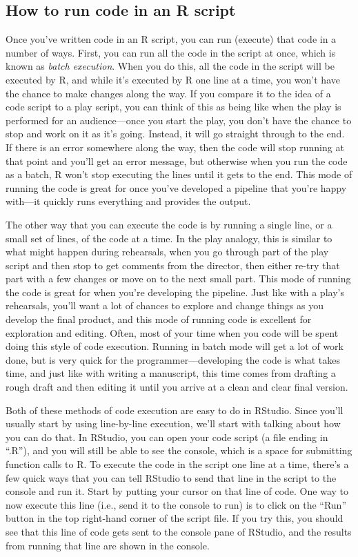 \documentclass[]{tufte-book}
\begin{document}
\subsection{How to run code in an R script}\label{how-to-run-code-in-an-r-script}

Once you've written code in an R script, you can run (execute) that code in a
number of ways. First, you can run all the code in the script at once, which is
known as \emph{batch execution}. When you do this, all the code in the script will be
executed by R, and while it's executed by R one line at a time, you won't have
the chance to make changes along the way. If you compare it to the idea of a
code script to a play script, you can think of this as being like when the
play is performed for an audience---once you start the play, you don't have
the chance to stop and work on it as it's going. Instead, it will go straight
through to the end. If there is an error somewhere along the way, then the code
will stop running at that point and you'll get an error message, but otherwise
when you run the code as a batch, R won't stop executing the lines until it gets
to the end. This mode of running the code is great for once you've developed a
pipeline that you're happy with---it quickly runs everything and provides the
output.

The other way that you can execute the code is by running a single line, or a
small set of lines, of the code at a time. In the play analogy, this is similar
to what might happen during rehearsals, when you go through part of the play
script and then stop to get comments from the director, then either re-try that
part with a few changes or move on to the next small part. This mode of running
the code is great for when you're developing the pipeline. Just like with a
play's rehearsals, you'll want a lot of chances to explore and change things as
you develop the final product, and this mode of running code is excellent for
exploration and editing. Often, most of your time when you code will be spent
doing this style of code execution. Running in batch mode will get a lot of work
done, but is very quick for the programmer---developing the code is what takes
time, and just like with writing a manuscript, this time comes from drafting a
rough draft and then editing it until you arrive at a clean and clear final
version.

Both of these methods of code execution are easy to do in RStudio. Since you'll
usually start by using line-by-line execution, we'll start with talking about how you
can do that. In RStudio, you can open your code script (a file ending in ``.R''),
and you will still be able to see the console, which is a space for submitting
function calls to R. To execute the code in the script one line at a time,
there's a few quick ways that you can tell RStudio to send that line in the
script to the console and run it. Start by putting your cursor on that line of code.
One way to now execute this line (i.e., send it to the console to run) is to
click on the ``Run'' button in the top right-hand corner of the script file. If
you try this, you should see that this line of code gets sent to the console
pane of RStudio, and the results from running that line are shown in the
console.
\end{document}
